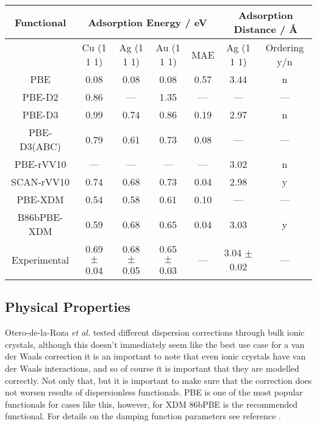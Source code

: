 \documentclass[10pt,a4paper,twocolumn,twoside]{extarticle}
\newcommand{\al}{\emph{et al. }}
\newcommand{\oA}{\si{\angstrom}}
\begin{document}
	\begin{figure*}
		\centering
		\begin{tabular}[]{c|c c c c | c c}
		Functional & \multicolumn{4}{c}{Adsorption Energy / eV \cite{Christian2016-CoinageAdsorption}}\ & \multicolumn{2}{c}{Adsorption Distance / \oA \cite{VV10-Adsorption}}\\
			\hline
			& Cu (1 1 1) & Ag (1 1 1) & Au (1 1 1) & MAE & Ag (1 1 1) &  Ordering y/n\\
		PBE	& 0.08 & 0.08 & 0.08 & 0.57 & 3.44 & n\\
		PBE-D2 & 0.86 & --- & 1.35 & --- & --- & ---\\
		PBE-D3 & 0.99 & 0.74 & 0.86 & 0.19 & 2.97 & n\\
		PBE-D3(ABC) & 0.79 & 0.61 & 0.73 & 0.08 & --- & ---\\
		PBE-rVV10 & --- & --- & --- & --- & 3.02 & n \\
		SCAN-rVV10 & 0.74 & 0.68 & 0.73 & 0.04 & 2.98 & y\\
		PBE-XDM & 0.54 & 0.58 & 0.61 & 0.10 & --- & ---\\
		B86bPBE-XDM & 0.59 & 0.68 & 0.65 & 0.04 & 3.03 & y\\
		Experimental & 0.69 $\pm$ 0.04 & 0.68 $\pm$ 0.05 & 0.65 $\pm$ 0.03 & --- & 3.04 $\pm$ 0.02 & ---

		\end{tabular}
	\end{figure*}


	\subsection{Physical Properties}
	Otero-de-la-Roza \al tested different dispersion corrections through bulk ionic crystals\cite{Roza-2020-XDM}, although this doesn't immediately seem like the best use case for a van der Waals correction it is an important to note that even ionic crystals have van der Waals interactions, and so of course it is important that they are modelled correctly. Not only that, but it is important to make sure that the correction does not worsen results of dispersionless functionals. PBE is one of the most popular functionals for cases like this, however, for XDM 86bPBE is the recommended functional. For details on the damping function parameters see reference \cite{PBE-underbinding}. 
	
\end{document}
